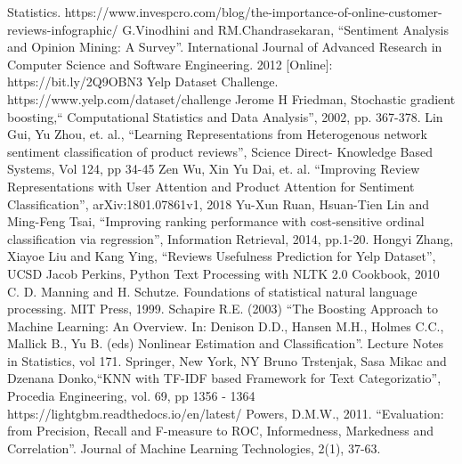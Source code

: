 \documentclass[letterpaper, 10 pt, conference]{ieeeconf}  %
\begin{document}


\begin{thebibliography}{99}

 Statistics. https://www.invespcro.com/blog/the-importance-of-online-customer-reviews-infographic/
 G.Vinodhini and RM.Chandrasekaran, ``Sentiment Analysis and Opinion Mining: A Survey''. International Journal of Advanced Research in Computer Science and Software Engineering. 2012 [Online]: https://bit.ly/2Q9OBN3
 Yelp Dataset Challenge. https://www.yelp.com/dataset/challenge
 Jerome H Friedman, Stochastic gradient boosting,`` Computational Statistics and Data Analysis'', 2002, pp. 367-378.
 Lin Gui, Yu Zhou, et. al., ``Learning Representations from Heterogenous network sentiment classification of product reviews'', Science Direct- Knowledge Based Systems, Vol 124, pp 34-45
 Zen Wu, Xin Yu Dai, et. al. ``Improving Review Representations with User Attention and Product Attention for Sentiment Classification'', arXiv:1801.07861v1, 2018
 Yu-Xun Ruan, Hsuan-Tien Lin and Ming-Feng Tsai, ``Improving ranking performance with cost-sensitive ordinal classification via regression'', Information Retrieval, 2014, pp.1-20.
 Hongyi Zhang,  Xiayoe Liu and Kang Ying, ``Reviews Usefulness Prediction for Yelp Dataset'', UCSD
 Jacob Perkins, Python Text Processing with NLTK 2.0 Cookbook, 2010
C. D. Manning and H. Schutze. Foundations of
statistical natural language processing. MIT Press,
1999.
Schapire R.E. (2003) ``The Boosting Approach to Machine Learning: An Overview. In: Denison D.D., Hansen M.H., Holmes C.C., Mallick B., Yu B. (eds) Nonlinear Estimation and Classification''. Lecture Notes in Statistics, vol 171. Springer, New York, NY
 Bruno Trstenjak, Sasa Mikac and Dzenana Donko,``KNN with TF-IDF based Framework for Text Categorizatio'', Procedia Engineering, vol. 69, pp 1356 - 1364 
 https://lightgbm.readthedocs.io/en/latest/
Powers, D.M.W., 2011. ``Evaluation: from Precision, Recall and F-measure to ROC, Informedness, Markedness and Correlation''. Journal of Machine Learning Technologies, 2(1), 37-63.


\end{thebibliography}
\end{document}

